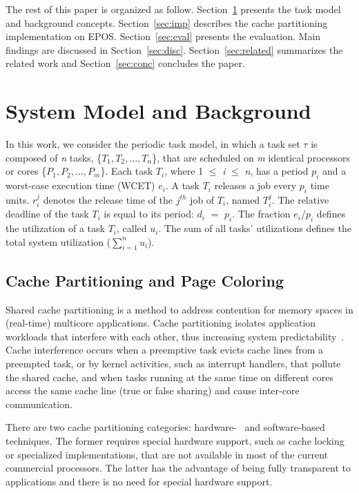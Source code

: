 \documentclass[10pt, conference, compsocconf]{IEEEtran}
\begin{document}
The rest of this paper is organized as follow. Section~\ref{sec:back} presents the task model and background concepts. Section~\ref{sec:imp} describes the cache partitioning implementation on EPOS. Section~\ref{sec:eval} presents the evaluation. Main findings are discussed in Section~\ref{sec:disc}. Section~\ref{sec:related} summarizes the related work and Section~\ref{sec:conc} concludes the paper.

\section{System Model and Background}
\label{sec:back}

In this  work, we  consider the periodic task model,  in which a  task set  $\tau$ is composed  of \textit{n}  tasks, \{$T_1,T_2,\ldots,T_n$\}, that are scheduled on \textit{m} identical processors or cores \{$P_{1},P_{2},\ldots,P_{m}$\}. Each task  $T_{i}$, where 1 $\leq$ \textit{i} $\leq$  \textit{n}, has a  period \textit{$p_{i}$} and  a worst-case execution time (WCET) \textit{$e_{i}$}. A task $T_{i}$ releases a job every \textit{$p_{i}$} time units. $r_i^j$ denotes the release time of the $j^{th}$ job of $T_{i}$, named $T_i^j$. The relative deadline of the task $T_i$ is equal to its period: $d_i$ $=$ $p_i$. The fraction \textit{$e_{i}$}/\textit{$p_{i}$} defines the utilization of a task $T_{i}$, called $u_i$. The sum of all tasks' utilizations defines the total system utilization ($\sum_{i=1}^n u_i$).

\subsection{Cache Partitioning and Page Coloring}

Shared cache partitioning is a method to address contention for memory spaces in (real-time) multicore applications. Cache partitioning isolates application workloads that interfere with each other, thus increasing system predictability~\cite{Suhendra:2008}. Cache interference occurs when a preemptive task evicts cache lines from a preempted task, or by kernel activities, such as interrupt handlers, that pollute the shared cache, and when tasks running at the same time on different cores access the same cache line (true or false sharing) and cause inter-core communication.

There are two cache partitioning categories: hardware-~\cite{Qureshi:2006,Suhendra:2008,Shekhar:2012} and software-based~\cite{Liedtke:1997,Chousein:2005,Guan:2009,Muralidhara:2010} techniques. The former requires special hardware support, such as cache locking or specialized implementations, that are not available in most of the current commercial processors. The latter has the advantage of being fully transparent to applications and there is no need for special hardware support.
\end{document}
